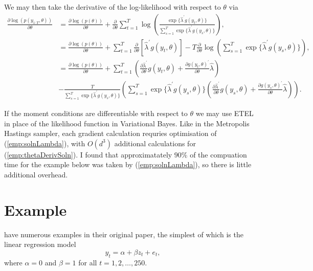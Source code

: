 \documentclass[12pt,a4paper]{article}\usepackage[]{graphicx}\usepackage[]{color}
\begin{document}
We may then take the derivative of the log-likelihood with respect to $\theta$ via
\begin{align}
\frac{\partial \log(p(y_{1:T}, \theta))}{\partial \theta} &= \frac{\partial \log(p(\theta))}{\partial \theta} + \frac{\partial}{\partial \theta} \sum_{t=1}^T \log \left( \frac{\exp \{\hat{\lambda}^{\prime} g(y_t, \theta) \}}{ \sum_{s=1}^T \exp \{\hat{\lambda}^{\prime} g(y_s, \theta) \}} \right), \nonumber \\
&= \frac{\partial \log(p(\theta))}{\partial \theta} + \sum_{t=1}^T \frac{\partial}{\partial \theta} \left[\hat{\lambda}^{\prime} g(y_t, \theta) \right]  - T \frac{\partial}{\partial \theta} \log \left(  \sum_{s=1}^T \exp \{\hat{\lambda}^{\prime} g(y_s, \theta) \} \right), \nonumber \\
&= \frac{\partial \log(p(\theta))}{\partial \theta} + \sum_{t=1}^T \left(\frac{\partial \hat{\lambda}^{\prime}}{\partial \theta} g(y_t, \theta) + \frac{\partial g(y_t, \theta)^{\prime}}{\partial \theta}\hat{\lambda}  \right) \nonumber \\
&- \frac{T}{\sum_{s=1}^T \exp \{\hat{\lambda}^{\prime} g(y_s, \theta) \}}\left(\sum_{s=1}^T \exp \{\hat{\lambda}^{\prime} g(y_s, \theta) \} \left(\frac{\partial \hat{\lambda}^{\prime}}{\partial \theta} g(y_s, \theta) + \frac{\partial g(y_s, \theta)^{\prime}}{\partial \theta}\hat{\lambda}  \right) \right). \label{emp:logpDeriv}
\end{align}

If the moment conditions are differentiable with respect to $\theta$ we may use ETEL in place of the likelihood function in Variational Bayes. Like in the Metropolis Hastings sampler, each gradient calculation requries optimisation of (\ref{emp:solnLambda}), with $O(d^3)$ additional calculations for (\ref{emp:thetaDerivSoln}). I found that approximatately $90\%$ of the compuation time for the example below was taken by (\ref{emp:solnLambda}), so there is little additional overhead.

\section{Example}

\citet{Chib2017} have numerous examples in their original paper, the simplest of which is the linear regression model
\begin{equation}
y_t = \alpha + \beta z_t + e_t,
\end{equation}
where $\alpha = 0$ and $\beta = 1$ for all $t = 1, 2, \dots, 250$.
\\
\end{document}
